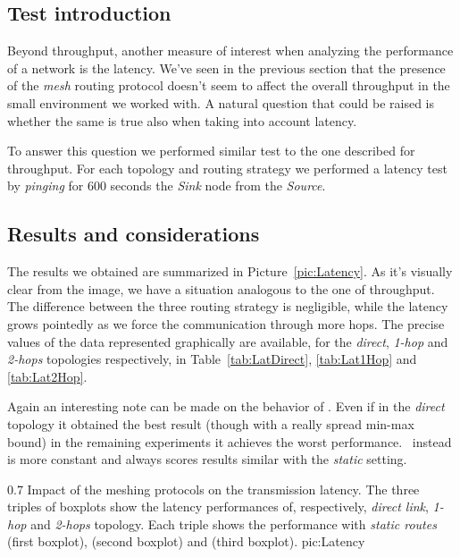 \subsection{Test introduction}

    Beyond throughput, another measure of interest when analyzing the
    performance of a network is the latency. We've seen in the
    previous section that the presence of the \emph{mesh} routing
    protocol doesn't seem to affect the overall throughput in the small
    environment we worked with. A natural question that could be
    raised is whether the same is true also when taking into account
    latency.

    To answer this question we performed similar test to the one
    described for throughput. For each topology and routing strategy we
    performed a latency test by \emph{pinging} for 600 seconds the
    \emph{Sink} node from the \emph{Source}.

\subsection{Results and considerations}

    The results we obtained are summarized in
    Picture~\ref{pic:Latency}. As it's visually clear from the image, we
    have a situation analogous to the one of throughput. The difference
    between the three routing strategy is negligible, while the latency
    grows pointedly as we force the communication through more hops.
    The precise values of the data represented graphically are available,
    for the \emph{direct}, \emph{1-hop} and \emph{2-hops} topologies
    respectively, in Table~\ref{tab:LatDirect}, \ref{tab:Lat1Hop} and
    \ref{tab:Lat2Hop}.

    Again an interesting note can be made on the behavior of \olsr. Even
    if in the \emph{direct} topology it obtained the best result (though
    with a really spread min-max bound) in the remaining experiments it
    achieves the worst performance. \batman\ instead is more constant and
    always scores results similar with the \emph{static} setting.

        {0.7 \columnwidth}
        {Impact of the meshing protocols on the transmission latency. The
         three triples of boxplots show the latency performances of,
         respectively, \emph{direct link}, \emph{1-hop} and \emph{2-hops}
         topology. Each triple shows the performance with \emph{static
         routes} (first boxplot), \emph{\batman} (second boxplot) and
         \emph{\olsr} (third boxplot).}
        {pic:Latency}

